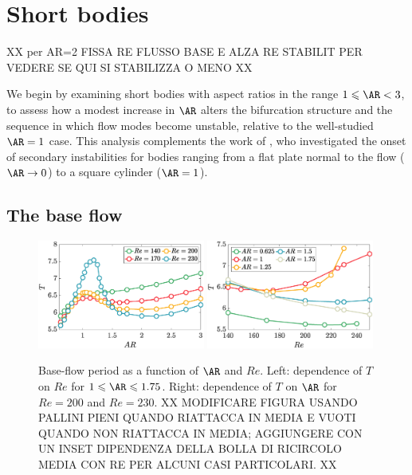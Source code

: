 \section{Short bodies}
\label{sec:short}

XX per AR=2 FISSA RE FLUSSO BASE E ALZA RE STABILIT PER VEDERE SE QUI SI STABILIZZA O MENO XX

We begin by examining short bodies with aspect ratios in the range $1 \le \AR <3$, to assess how a modest increase in $\AR$ alters the bifurcation structure and the sequence in which flow modes become unstable, relative to the well-studied $\AR=1$ case. This analysis complements the work of \cite{choi-yang-2014}, who investigated the onset of secondary instabilities for bodies ranging from a flat plate normal to the flow ($\AR \rightarrow 0$) to a square cylinder ($\AR=1$).

\subsection{The base flow}

\begin{figure}
  \centering
  \includegraphics[width=0.49\textwidth]{./fig/AR1s/T_AR.eps}
  \includegraphics[width=0.49\textwidth]{./fig/AR1s/T_Re.eps}
  \caption{Base-flow period as a function of $\AR$ and $Re$. Left: dependence of $T$ on $Re$ for $1 \le \AR \le 1.75$. Right: dependence of $T$ on $\AR$ for $Re=200$ and $Re=230$. XX MODIFICARE FIGURA USANDO PALLINI PIENI QUANDO RIATTACCA IN MEDIA E VUOTI QUANDO NON RIATTACCA IN MEDIA; AGGIUNGERE CON UN INSET DIPENDENZA DELLA BOLLA DI RICIRCOLO MEDIA CON RE PER ALCUNI CASI PARTICOLARI. XX}
  \label{fig:T_Re_small}
\end{figure}
%


